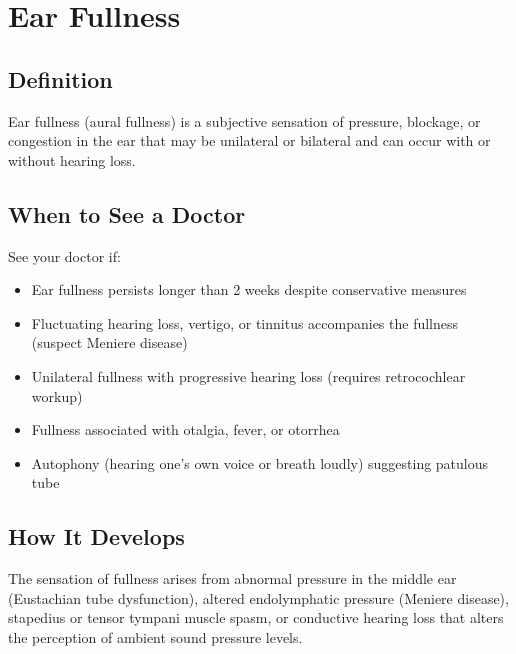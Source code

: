 \chapter{Ear Fullness}

\section*{Definition}
Ear fullness (aural fullness) is a subjective sensation of pressure, blockage, or congestion in the ear that may be unilateral or bilateral and can occur with or without hearing loss.

\section*{When to See a Doctor}
See your doctor if:
\begin{itemize}
  \item Ear fullness persists longer than 2 weeks despite conservative measures
  \item Fluctuating hearing loss, vertigo, or tinnitus accompanies the fullness (suspect Meniere disease)
  \item Unilateral fullness with progressive hearing loss (requires retrocochlear workup)
  \item Fullness associated with otalgia, fever, or otorrhea
  \item Autophony (hearing one's own voice or breath loudly) suggesting patulous tube
\end{itemize}

\section*{How It Develops}
The sensation of fullness arises from abnormal pressure in the middle ear (Eustachian tube dysfunction), altered endolymphatic pressure (Meniere disease), stapedius or tensor tympani muscle spasm, or conductive hearing loss that alters the perception of ambient sound pressure levels.

